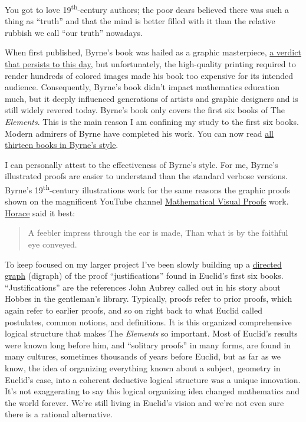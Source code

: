 You got to love 19\textsuperscript{th}-century authors; the poor dears
believed there was such a thing as ``truth'' and that the mind is better
filled with it than the relative rubbish we call ``our truth'' nowadays.

When first published, Byrne's book was hailed as a graphic masterpiece,
\href{https://www.maa.org/press/periodicals/convergence/oliver-byrne-the-matisse-of-mathematics-byrnes-euclid-geometry-understood-via-color-coded-diagrams}{a
verdict that persists to this day}, but unfortunately, the high-quality
printing required to render hundreds of colored images made his book too
expensive for its intended audience. Consequently, Byrne's book didn't
impact mathematics education much, but it deeply influenced generations
of artists and graphic designers and is still widely revered today.
Byrne's book only covers the first six books of The \emph{Elements}.
This is the main reason I am confining my study to the first six books.
Modern admirers of Byrne have completed his work. You can now read
\href{https://www.kroneckerwallis.com/product/euclids-elements-completing-oliver-byrnes-work/}{all
thirteen books in Byrne's style}.

I can personally attest to the effectiveness of Byrne's style. For me,
Byrne's illustrated proofs are easier to understand than the standard
verbose versions. Byrne's 19\textsuperscript{th}-century illustrations
work for the same reasons the graphic proofs shown on the magnificent
YouTube channel
\href{https://www.youtube.com/c/MicroVisualProofs}{Mathematical Visual
Proofs} work.
\href{https://www.britannica.com/biography/Horace-Roman-poet}{Horace}
said it best:

\begin{quote}
A feebler impress through the ear is made,\newline
Than what is by the faithful eye conveyed.
\end{quote}

To keep focused on my larger project I've been slowly building up a
\href{https://en.wikipedia.org/wiki/Directed_graph}{directed graph}
(digraph) of the proof ``justifications'' found in Euclid's first six
books. ``Justifications'' are the references John Aubrey called out in
his story about Hobbes in the gentleman's library. Typically, proofs
refer to prior proofs, which again refer to earlier proofs, and so on
right back to what Euclid called postulates, common notions, and
definitions. It is this organized comprehensive logical structure that
makes The \emph{Elements} so important. Most of Euclid's results were
known long before him, and ``solitary proofs'' in many forms, are found
in many cultures, sometimes thousands of years before Euclid, but as far
as we know, the idea of organizing everything known about a subject,
geometry in Euclid's case, into a coherent deductive logical structure
was a unique innovation. It's not exaggerating to say this logical
organizing idea changed mathematics and the world forever. We're still
living in Euclid's vision and we're not even sure there is a rational
alternative.

